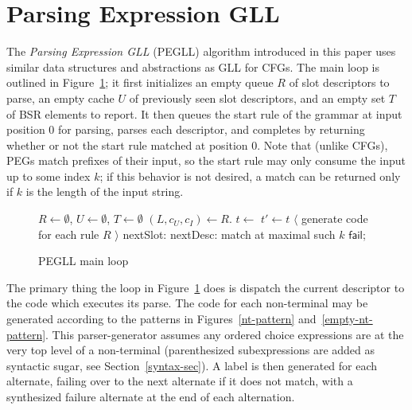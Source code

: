\documentclass{article}
\newcommand{\fail}{\mathsf{fail}}
\begin{document}
\section{Parsing Expression GLL}
The \emph{Parsing Expression GLL} (PEGLL) algorithm introduced in this paper uses similar data structures and abstractions as GLL for CFGs. 
The main loop is outlined in Figure~\ref{main-loop-algo}; it first initializes an empty queue $R$ of slot descriptors to parse, an empty cache $U$ of previously seen slot descriptors, and an empty set $T$ of BSR elements to report.
It then queues the start rule of the grammar at input position 0 for parsing, parses each descriptor, and completes by returning whether or not the start rule matched at position 0. 
Note that (unlike CFGs), PEGs match prefixes of their input, so the start rule may only consume the input up to some index $k$; if this behavior is not desired, a match can be returned only if $k$ is the length of the input string.

\begin{figure}
\caption{PEGLL main loop} \label{main-loop-algo}
\begin{algorithmic}
\State $R \gets \emptyset$, $U \gets \emptyset$, $T \gets \emptyset$
\State {}
    \State $(L, c_U, c_I) \gets R$.
    \State $t \gets$  $t' \gets t$
    \Loop
            \State $\langle$ generate code for each rule $R$ $\rangle$
        \EndSwitch
    \State nextSlot: \EndLoop
\State nextDesc: \EndWhile
{}
    \State \Return match at maximal such $k$
\Else
    \State \Return $\fail$;
\EndIf
\end{algorithmic}
\end{figure}

The primary thing the loop in Figure~\ref{main-loop-algo} does is dispatch the current descriptor to the code which executes its parse. 
The code for each non-terminal may be generated according to the patterns in Figures~\ref{nt-pattern} and~\ref{empty-nt-pattern}. 
This parser-generator assumes any ordered choice expressions are at the very top level of a non-terminal (parenthesized subexpressions are added as syntactic sugar, see Section~\ref{syntax-sec}). 
A label is then generated for each alternate, failing over to the next alternate if it does not match, with a synthesized failure alternate at the end of each alternation.
\end{document}
